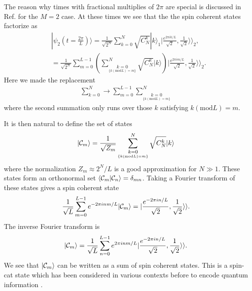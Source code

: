 \documentclass[%
  prx,%
  twocolumn,%
  preprintnumbers,%
  amsmath,%
  amssymb,%
  superscriptaddress%
]{revtex4}
\begin{document}
The reason why times with fractional multiplies of $ 2 \pi  $ are special is discussed in Ref.  \cite{byrnes2013fractality} for the $M = 2 $ case.  At these times we see that the the spin coherent states factorize as
%
\begin{align}
&|\psi_2 (t= \frac{2\pi}{L} )  \rangle=\frac{1}{\sqrt{2^N}}\sum_{k=0}^N \sqrt{C_{N}^{k}}|k\rangle_1  |\frac{e^{2 \pi i k/L }}{\sqrt{2}},\frac{1}{\sqrt{2}}\rangle\rangle_2 ,  \label{firstlinepsi2} \\
& = \frac{1}{\sqrt{2^N}} \sum_{m=0}^{L-1} \left(  \sum^N_{  \underset{  \{ k (\text{mod} L ) =m \} }{k=0} }   \sqrt{C_{N}^{k}}|k\rangle  \right)  |\frac{e^{2 \pi i m/L }}{\sqrt{2}},\frac{1}{\sqrt{2}}\rangle\rangle_2 .
\label{M2psiv2}
\end{align}
%
Here we made the replacement
%
\begin{align}
\sum_{k=0}^N \rightarrow \sum_{m=0}^{L-1} \sum^N_{  \underset{  \{ k (\text{mod} L ) =m \} }{k=0} }
\end{align}
%
where the second summation only runs over those $ k $ satisfying $ k (\text{mod} L) = m $.

It is then natural to define the set of states
%
\begin{align}
|{\cal C}_m \rangle = \frac{1}{\sqrt{Z_m}}  \sum^N_{  \underset{  \{ k (\text{mod} L ) =m \} }{k=0} }  \sqrt{C_{N}^{k}}|k\rangle
\end{align}
%
where the normalization $ Z_m \approx 2^N/L $ is a good approximation for $ N \gg 1 $.  These states form an orthonormal set $ \langle {\cal C}_m | {\cal C}_n \rangle = \delta_{mn} $. Taking a Fourier transform of these states gives a spin coherent state
%
\begin{align}
\frac{1}{\sqrt{L}} \sum_{m=0}^{L-1} e^{-2 \pi i n m/L } |{\cal C}_m \rangle  =| \frac{e^{-2 \pi i n /L }}{\sqrt{2}}, \frac{1}{\sqrt{2}} \rangle \rangle .
\end{align}
%
The inverse Fourier transform is
%
\begin{align}
|{\cal C}_m \rangle = \frac{1}{\sqrt{L}} \sum_{n=0}^{L-1}
e^{2 \pi i n m/L } | \frac{e^{-2 \pi i n /L }}{\sqrt{2}}, \frac{1}{\sqrt{2}} \rangle \rangle .
\label{invfouriercat}
\end{align}
%
We see that $ |{\cal C}_m \rangle$ can be written as a sum of spin coherent states.  This is a spin-cat state which has been considered in various contexts before to encode quantum information \cite{agarwal1997atomic,semenenko2016implementing,qin2021generating,omanakuttan2024fault}.
\end{document}

